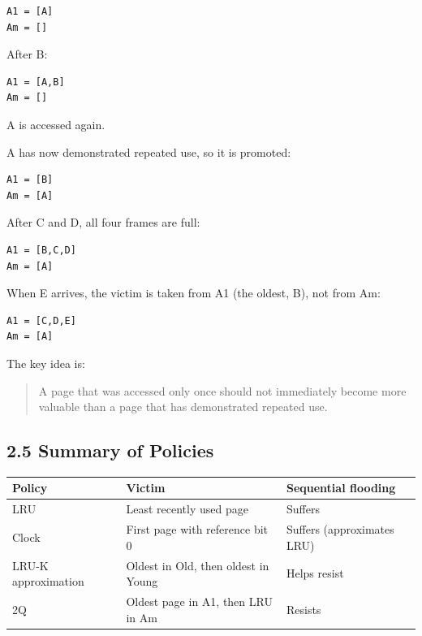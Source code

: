 \documentclass[12pt,a4paper]{article}
\begin{document}
\begin{verbatim}
A1 = [A]
Am = []
\end{verbatim}

After B:

\begin{verbatim}
A1 = [A,B]
Am = []
\end{verbatim}

A is accessed again.

A has now demonstrated repeated use, so it is promoted:

\begin{verbatim}
A1 = [B]
Am = [A]
\end{verbatim}

After C and D, all four frames are full:

\begin{verbatim}
A1 = [B,C,D]
Am = [A]
\end{verbatim}

When E arrives, the victim is taken from A1 (the oldest, B), not from Am:

\begin{verbatim}
A1 = [C,D,E]
Am = [A]
\end{verbatim}

The key idea is:

\begin{quote}
A page that was accessed only once should not immediately become more valuable than a page that has demonstrated repeated use.
\end{quote}

\subsection{2.5 Summary of Policies}

\begin{center}
\begin{tabular}{p{}|p{}|p{}}
\toprule
Policy & Victim & Sequential flooding \\
\midrule
LRU & Least recently used page & Suffers \\
Clock & First page with reference bit 0 & Suffers (approximates LRU) \\
LRU-K approximation & Oldest in Old, then oldest in Young & Helps resist \\
2Q & Oldest page in A1, then LRU in Am & Resists \\
\bottomrule
\end{tabular}
\end{center}
\end{document}
